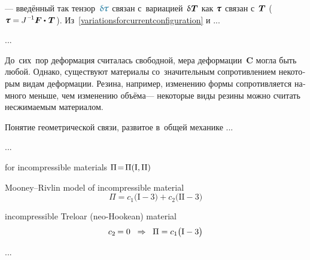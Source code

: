 \begin{otherlanguage}{russian}
\vspace{-0.2em} \noindent --- введённый так тензор~${\varbivalent{\hspace{-0.2ex}\cauchystress}}$ связан с~вариацией~$\variation{\hspace{.1ex}\firstpiolakirchhoffstress}$ как $\cauchystress$ связан с~$\bm{T}$ (${\cauchystress = \hspace{-0.1ex} J^{\hspace{.12ex}\expminusone} \bm{F} \dotp \hspace{.16ex} \firstpiolakirchhoffstress\hspace{.2ex}}$). Из~\eqref{variationsforcurrentconfiguration} и ...

...



\end{otherlanguage}



\label{para:internalconstraints}

\begin{otherlanguage}{russian}

До~сих~пор деформация считалась свободной, мера деформации~$\bm{C}$ могла быть любой. Однако, существуют материалы со~значительным сопротивлением некоторым видам деформации. Резина, например, изменению формы сопротивляется намного меньше, чем изменению объёма\:--- некоторые виды резины можно считать несжимаемым материалом.

Понятие геометрической связи, развитое в~общей механике ...

...

for incompressible materials ${\Pi \hspace{-0.4ex} = \hspace{-0.33ex} \Pi(\mathrm{I}, \mathrm{II})}$

Mooney\hbox{--}Rivlin model of incompressible material
\[
\Pi = c_1 \bigl( \mathrm{I} - 3\bigr) + c_2 \bigl( \mathrm{II} - 3\bigr)
\]

incompressible Treloar (neo-Hookean) material
\[
c_2 \hspace{-0.16ex} = 0
\;\;\Rightarrow\;\;
\Pi = c_1 \bigl( \mathrm{I} - 3\bigr)
\]

...


\end{otherlanguage}

